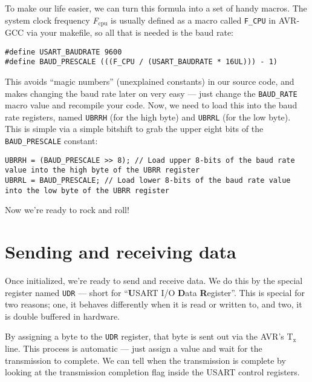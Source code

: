 \documentclass[a4paper,oneside]{book}
\newcommand{\subscript}[1]{\ensuremath{_{\textrm{#1}}}}
\begin{document}
To make our life easier, we can turn this formula into a set of handy macros. The system clock frequency \emph{F\subscript{cpu}} is usually defined as a macro called \texttt{F\_CPU} in AVR-GCC via your makefile, so all that is needed is the baud rate:

\begin{center}
\begin{lstlisting}
#define USART_BAUDRATE 9600
#define BAUD_PRESCALE (((F_CPU / (USART_BAUDRATE * 16UL))) - 1)
\end{lstlisting}
\end{center}

This avoids ``magic numbers'' (unexplained constants) in our source code, and makes changing the baud rate later on very easy --- just change the \texttt{BAUD\_RATE} macro value and recompile your code. Now, we need to load this into the baud rate registers, named \texttt{UBRRH} (for the high byte) and \texttt{UBRRL} (for the low byte). This is simple via a simple bitshift to grab the upper eight bits of the \texttt{BAUD\_PRESCALE} constant:

\begin{center}
\begin{lstlisting}
UBRRH = (BAUD_PRESCALE >> 8); // Load upper 8-bits of the baud rate value into the high byte of the UBRR register
UBRRL = BAUD_PRESCALE; // Load lower 8-bits of the baud rate value into the low byte of the UBRR register
\end{lstlisting}
\end{center}

Now we're ready to rock and roll!


\chapter{Sending and receiving data}

Once initialized, we're ready to send and receive data. We do this by the special register named \texttt{UDR} --- short for ``\textbf{U}SART I/O \textbf{D}ata \textbf{R}egister''. This is special for two reasons; one, it behaves differently when it is read or written to, and two, it is double buffered in hardware.

By assigning a byte to the \texttt{UDR} register, that byte is sent out via the AVR's T\subscript{x} line. This process is automatic --- just assign a value and wait for the transmission to complete. We can tell when the transmission is complete by looking at the transmission completion flag inside the USART control registers.
\end{document}
